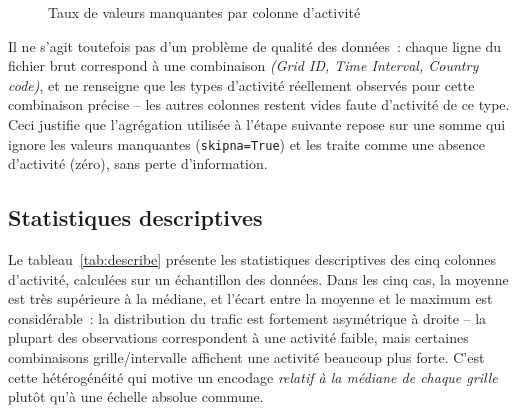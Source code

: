 \begin{figure}[htbp]
  \centering
  \caption{Taux de valeurs manquantes par colonne d'activité}
  \label{fig:missing}
\end{figure}

Il ne s'agit toutefois pas d'un problème de qualité des données~:
chaque ligne du fichier brut correspond à une combinaison
\emph{(Grid ID, Time Interval, Country code)}, et ne renseigne que les
types d'activité réellement observés pour cette combinaison précise
-- les autres colonnes restent vides faute d'activité de ce type. Ceci
justifie que l'agrégation utilisée à l'étape suivante repose sur une
somme qui ignore les valeurs manquantes (\texttt{skipna=True}) et les
traite comme une absence d'activité (zéro), sans perte d'information.

\subsection{Statistiques descriptives}

Le tableau~\ref{tab:describe} présente les statistiques descriptives
des cinq colonnes d'activité, calculées sur un échantillon des
données. Dans les cinq cas, la moyenne est très supérieure à la
médiane, et l'écart entre la moyenne et le maximum est considérable~:
la distribution du trafic est fortement asymétrique à droite -- la
plupart des observations correspondent à une activité faible, mais
certaines combinaisons grille/intervalle affichent une activité
beaucoup plus forte. C'est cette hétérogénéité qui motive un encodage
\emph{relatif à la médiane de chaque grille} plutôt qu'à une échelle
absolue commune.

